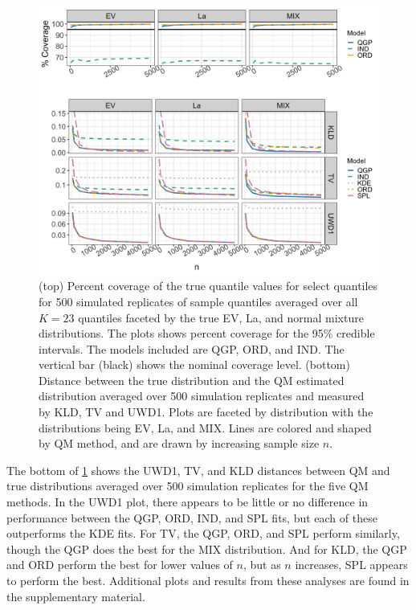 \documentclass[preprint,12pt,authoryear]{elsarticle}
\newcommand{\1}[1]{\mathds{1}\left[#1\right]}
\begin{document}
\begin{figure}[hbt!]
\centering
\includegraphics[width=.9\linewidth]{Images/uk_cover_dist.png}
\caption{
(top) Percent coverage of the true quantile values for select quantiles for 
500 simulated replicates of sample quantiles averaged over all $K = 23$
quantiles faceted by the true EV, La, and normal mixture distributions.
The plots shows percent coverage for the 95\% credible intervals. The models 
included are QGP, ORD, and IND. The vertical bar (black) shows the nominal 
coverage level.
(bottom) Distance between the true distribution and the QM estimated 
distribution 
averaged over 500 simulation replicates and measured by KLD, TV and UWD1. 
Plots are faceted by distribution with the distributions being 
EV, La, and MIX. 
Lines are colored and shaped by QM method, and are drawn by increasing sample 
size $n$.}
\label{fig:uk_cover}
\end{figure}





The bottom of \ref{fig:uk_cover} shows the UWD1, TV, and KLD distances between 
QM and true distributions averaged over 500 simulation replicates for the 
five QM methods. In the UWD1 plot, there appears to be little or no difference
in performance between the QGP, ORD, IND, and SPL fits, but each of these
outperforms the KDE fits. For TV, the QGP, ORD, and SPL perform similarly, 
though the QGP does the best for the MIX distribution.
And for KLD, the QGP and ORD perform the best for lower values of $n$, but as
$n$ increases, SPL appears to perform the best. Additional plots and results
from these analyses are found in the supplementary material.
\end{document}

